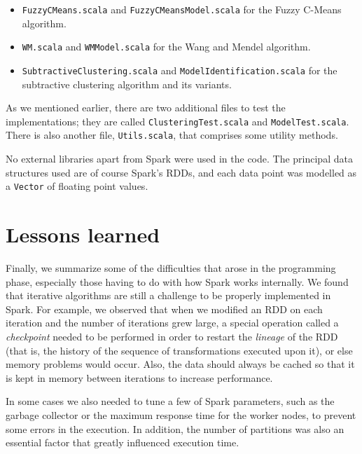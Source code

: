 \begin{itemize}
  \item \verb|FuzzyCMeans.scala| and \verb|FuzzyCMeansModel.scala| for the Fuzzy C-Means algorithm.
  \item \verb|WM.scala| and \verb|WMModel.scala| for the Wang and Mendel algorithm.
  \item \verb|SubtractiveClustering.scala| and \verb|ModelIdentification.scala| for the subtractive clustering algorithm and its variants.
\end{itemize}
As we mentioned earlier, there are two additional files to test the implementations; they are called \verb|ClusteringTest.scala| and \verb|ModelTest.scala|. There is also another file, \verb|Utils.scala|, that comprises some utility methods.

No external libraries apart from Spark were used in the code. The principal data structures used are of course Spark's RDDs, and each data point was modelled as a \verb|Vector| of floating point values.

\section*{Lessons learned}

Finally, we summarize some of the difficulties that arose in the programming phase, especially those having to do with how Spark works internally. We found that iterative algorithms are still a challenge to be properly implemented in Spark. For example, we observed that when we modified an RDD on each iteration and the number of iterations grew large, a special operation called a \textit{checkpoint} needed to be performed in order to restart the \textit{lineage} of the RDD (that is, the history of the sequence of transformations executed upon it), or else memory problems would occur. Also, the data should always be cached so that it is kept in memory between iterations to increase performance.

In some cases we also needed to tune a few of Spark parameters, such as the garbage collector or the maximum response time for the worker nodes, to prevent some errors in the execution. In addition, the number of partitions was also an essential factor that greatly influenced execution time.
